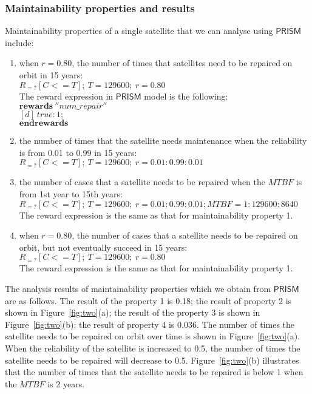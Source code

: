 \documentclass[preprint,12pt]{qrei}
\begin{document}
\subsubsection{Maintainability properties and results}

Maintainability properties of a single satellite that we can analyse using $\mathsf{PRISM}$ include:

\begin{enumerate}
\item when $r=0.80$, the number of times that satellites need to be repaired on orbit in 15 years:\\
$R_{=?} [ C<=T ];\ T=129600;\ r=0.80$\\
The reward expression in $\mathsf{PRISM}$ model is the following:\\
$\textbf{rewards}\ ''num\_repair''$\\
$[d]\ true : 1;$\\
$\textbf{endrewards}$
\item the number of times that the satellite needs maintenance when the reliability is from 0.01 to 0.99 in 15 years:\\
$R_{=?}[C<=T ];\ T=129600;\ r=0.01:0.99:0.01$
\item the number of cases that a satellite needs to be repaired when the $MTBF$ is from 1st year to 15th years:\\
$R_{=?}[C<=T ];\ T=129600;\ r=0.01:0.99:0.01; MTBF=1:129600:8640$\\
The reward expression is the same as that for maintainability property 1.
\item when $r=0.80$, the number of cases that a satellite needs to be repaired on orbit, but not eventually succeed in 15 years:\\
$R_{=?}[C<=T];\ T=129600;\ r=0.80$\\
The reward expression is the same as that for maintainability property 1.
\end{enumerate}

The analysis results of maintainability properties which we obtain from $\mathsf{PRISM}$ are as follows. The result of the property 1 is 0.18; the result of property 2 is shown in Figure~\ref{fig:two}(a); the result of the property 3 is shown in Figure~\ref{fig:two}(b); the result of property 4 is 0.036. The number of times the satellite needs to be repaired on orbit over time is shown in Figure~\ref{fig:two}(a). When the reliability of the satellite is increased to 0.5, the number of times the satellite needs to be repaired will decrease to 0.5. Figure~\ref{fig:two}(b) illustrates that the number of times that the satellite needs to be repaired is below 1 when the $MTBF$ is 2 years. 
\end{document}
